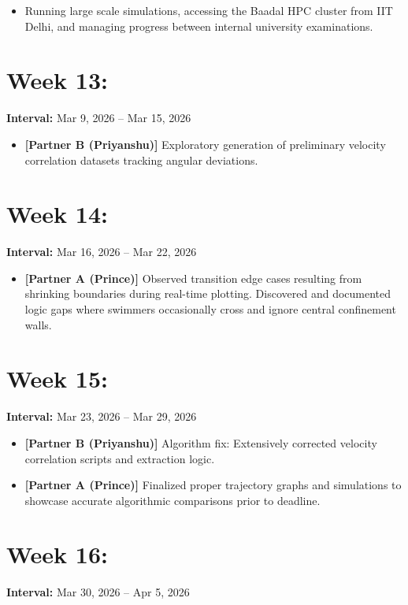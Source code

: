 \documentclass[11pt]{article}
\begin{document}
\begin{itemize}[noitemsep]
    \item Running large scale simulations, accessing the Baadal HPC cluster from IIT Delhi, and managing progress between internal university examinations.
\end{itemize}

\section*{Week 13: }
\textbf{Interval:} Mar 9, 2026 -- Mar 15, 2026

\begin{itemize}[noitemsep]
    \item \textbf{[Partner B (Priyanshu)]} Exploratory generation of preliminary velocity correlation datasets tracking angular deviations.
\end{itemize}

\section*{Week 14: }
\textbf{Interval:} Mar 16, 2026 -- Mar 22, 2026

\begin{itemize}[noitemsep]
    \item \textbf{[Partner A (Prince)]} Observed transition edge cases resulting from shrinking boundaries during real-time plotting. Discovered and documented logic gaps where swimmers occasionally cross and ignore central confinement walls.
\end{itemize}

\section*{Week 15: }
\textbf{Interval:} Mar 23, 2026 -- Mar 29, 2026

\begin{itemize}[noitemsep]
    \item \textbf{[Partner B (Priyanshu)]} Algorithm fix: Extensively corrected velocity correlation scripts and extraction logic.
    \item \textbf{[Partner A (Prince)]} Finalized proper trajectory graphs and simulations to showcase accurate algorithmic comparisons prior to deadline.
\end{itemize}

\section*{Week 16: }
\textbf{Interval:} Mar 30, 2026 -- Apr 5, 2026
\end{document}
